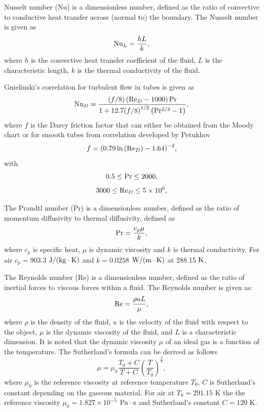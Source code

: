 \documentclass[preprint,5p,twocolumn,10pt,sort&compress]{elsarticle}
\begin{document}
Nusselt number (Nu) is a dimensionless number, defined as the ratio of convective to conductive heat transfer across (normal to) the boundary.
The Nusselt number is given as \cite{Bergman2017}
\begin{equation}
{\rm{N}}{{\rm{u}}_L} = \frac{{hL}}{k},
\end{equation}
where $h$ is the convective heat transfer coefficient of the fluid, $L$ is the characteristic length, $k$ is the thermal conductivity of the fluid.

Gnielinski's correlation for turbulent flow in tubes \cite{Gnielinski1975} is given as
\begin{equation}
{\rm{N}}{{\rm{u}}_D} = \frac{{\left( {f/8} \right)\left( {{\rm{R}}{{\rm{e}}_D} - 1000} \right){\rm{Pr}}}}{{1 + 12.7{{(f/8)}^{1/2}}\left( {{\rm{P}}{{\rm{r}}^{2/3}} - 1} \right)}},
\end{equation}
where $f$ is the Darcy friction factor that can either be obtained from the Moody chart or for smooth tubes from correlation developed by Petukhov \cite{Bergman2017} 
\begin{equation}
f = {\left( {0.79\ln \left( {{\rm{R}}{{\rm{e}}_D}} \right) - 1.64} \right)^{ - 2}},
\end{equation}
with
\begin{equation}
0.5 \le {\rm{Pr}} \le 2000,
\end{equation}
\begin{equation}
3000 \le {\rm{R}}{{\rm{e}}_D} \le 5 \times {10^6},
\end{equation}

The Prandtl number (Pr) is a dimensionless number, defined as the ratio of momentum diffusivity to thermal diffusivity, defined as
\begin{equation}
{\rm{Pr}} = \frac{{{c_p}\mu }}{k},
\end{equation}
where
$c_{p}$ is specific heat, $\mu$ is dynamic viscosity and $k$ is thermal conductivity. For air $c_{p}=903.3$ ${\rm{J/(kg}} \cdot {\rm{K}})$ and $k=0.0258$ ${\rm{W/(m}} \cdot {\rm{K}})$ at 288.15 ${\rm{K}}$.

The Reynolds number (Re) is a dimensionless number, defined as the ratio of inertial forces to viscous forces within a fluid.
The Reynolds number is given as:
\begin{equation}
{\rm{Re}} = \frac{{\rho uL}}{\mu },
\end{equation}
where
$\rho$ is the density of the fluid, $u$ is the velocity of the fluid with respect to the object, $\mu$ is the dynamic viscosity of the fluid, and $L$ is a characteristic dimension.
It is noted that the dynamic viscosity $\mu$ of an ideal gas is a function of the temperature. The Sutherland's formula can be derived as follows
\begin{equation}
\mu  = {\mu _0}\frac{{{T_0} + C}}{{T + C}}{\left( {\frac{T}{{{T_0}}}} \right)^{\frac{3}{2}}},
\end{equation}
where 
$\mu_0$ is the reference viscosity at reference temperature $T_0$,
$C$ is Sutherland's constant depending on the gaseous material. For air at $T_0=291.15$ K the the reference viscosity $\mu_0=1.827\times 10^{-5}$ $\rm{Pa\cdot s}$ and Sutherland's constant $C=120$ K.
\end{document}
